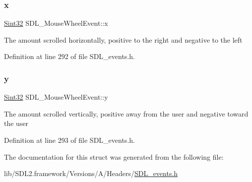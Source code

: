 \subsubsection{\texorpdfstring{x}{x}}
{\footnotesize\ttfamily \mbox{\hyperlink{_s_d_l__stdinc_8h_a7a90b941db9d4582e9ad7abb9940ff7e}{Sint32}} S\+D\+L\+\_\+\+Mouse\+Wheel\+Event\+::x}

The amount scrolled horizontally, positive to the right and negative to the left 

Definition at line 292 of file S\+D\+L\+\_\+events.\+h.

\mbox{\label{struct_s_d_l___mouse_wheel_event_a53fdf77a464426bc8b30e629795f044b}} 
\subsubsection{\texorpdfstring{y}{y}}
{\footnotesize\ttfamily \mbox{\hyperlink{_s_d_l__stdinc_8h_a7a90b941db9d4582e9ad7abb9940ff7e}{Sint32}} S\+D\+L\+\_\+\+Mouse\+Wheel\+Event\+::y}

The amount scrolled vertically, positive away from the user and negative toward the user 

Definition at line 293 of file S\+D\+L\+\_\+events.\+h.



The documentation for this struct was generated from the following file\+:\begin{DoxyCompactItemize}
\item 
lib/\+S\+D\+L2.\+framework/\+Versions/\+A/\+Headers/\mbox{\hyperlink{_s_d_l__events_8h}{S\+D\+L\+\_\+events.\+h}}\end{DoxyCompactItemize}
